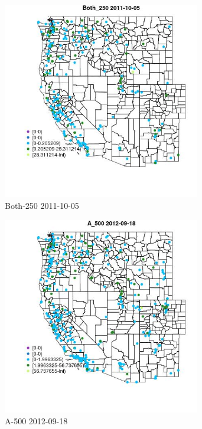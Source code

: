 \begin{figure} 
\centering  
\includegraphics[width=0.77\textwidth]{Code_Outputs/ML_input_report_ML_input_PM25_Step5_part_d_de_duplicated_aves_ML_input_MapObsBoth_2502011-10-05.jpg} 
\caption{\label{fig:ML_input_report_ML_input_PM25_Step5_part_d_de_duplicated_aves_ML_inputMapObsBoth_2502011-10-05}Both-250 2011-10-05} 
\end{figure} 
 

\begin{figure} 
\centering  
\includegraphics[width=0.77\textwidth]{Code_Outputs/ML_input_report_ML_input_PM25_Step5_part_d_de_duplicated_aves_ML_input_MapObsA_5002012-09-18.jpg} 
\caption{\label{fig:ML_input_report_ML_input_PM25_Step5_part_d_de_duplicated_aves_ML_inputMapObsA_5002012-09-18}A-500 2012-09-18} 
\end{figure} 
 

